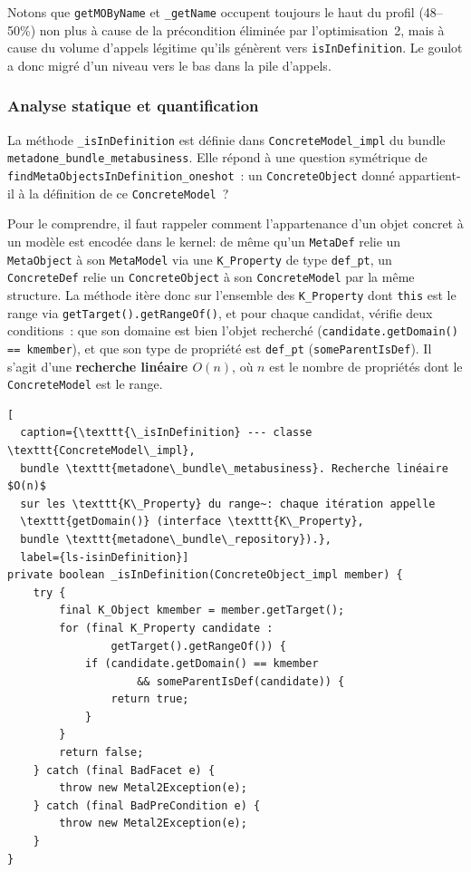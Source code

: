 Notons que \texttt{getMOByName} et \texttt{\_getName} occupent toujours
le haut du profil (48--50\%) non plus à cause de la précondition
éliminée par l'optimisation~2, mais à cause du volume d'appels légitime
qu'ils génèrent vers \texttt{isInDefinition}. Le goulot a donc migré
d'un niveau vers le bas dans la pile d'appels.

\subsubsection{Analyse statique et quantification}

La méthode \texttt{\_isInDefinition} est définie dans
\texttt{ConcreteModel\_impl} du bundle
\texttt{metadone\_bundle\_metabusiness}. Elle répond à une question
symétrique de \texttt{findMetaObjectsInDefinition\_oneshot}~: un
\texttt{ConcreteObject} donné appartient-il à la définition de ce
\texttt{ConcreteModel}~?

Pour le comprendre, il faut rappeler comment l'appartenance d'un objet
concret à un modèle est encodée dans le kernel: de même qu'un \texttt{MetaDef} relie un
\texttt{MetaObject} à son \texttt{MetaModel} via une \texttt{K\_Property}
de type \texttt{def\_pt}, un \texttt{ConcreteDef} relie un
\texttt{ConcreteObject} à son \texttt{ConcreteModel} par la même
structure. La méthode itère donc sur l'ensemble des \texttt{K\_Property}
dont \texttt{this} est le range via \texttt{getTarget().getRangeOf()}, et
pour chaque candidat, vérifie deux conditions~: que son domaine est bien
l'objet recherché (\texttt{candidate.getDomain() == kmember}), et que son
type de propriété est \texttt{def\_pt} (\texttt{someParentIsDef}).
Il s'agit d'une \textbf{recherche linéaire $O(n)$}, où $n$ est le nombre
de propriétés dont le \texttt{ConcreteModel} est le range.

\begin{lstlisting}[
  caption={\texttt{\_isInDefinition} --- classe \texttt{ConcreteModel\_impl},
  bundle \texttt{metadone\_bundle\_metabusiness}. Recherche linéaire $O(n)$
  sur les \texttt{K\_Property} du range~: chaque itération appelle
  \texttt{getDomain()} (interface \texttt{K\_Property},
  bundle \texttt{metadone\_bundle\_repository}).},
  label={ls-isinDefinition}]
private boolean _isInDefinition(ConcreteObject_impl member) {
    try {
        final K_Object kmember = member.getTarget();
        for (final K_Property candidate :
                getTarget().getRangeOf()) {
            if (candidate.getDomain() == kmember
                    && someParentIsDef(candidate)) {
                return true;
            }
        }
        return false;
    } catch (final BadFacet e) {
        throw new Metal2Exception(e);
    } catch (final BadPreCondition e) {
        throw new Metal2Exception(e);
    }
}
\end{lstlisting}

